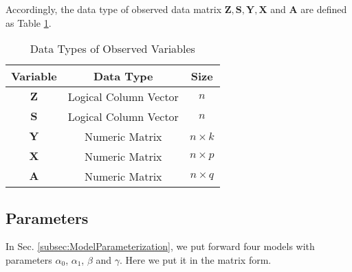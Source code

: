 \documentclass[article]{jss}
\begin{document}
Accordingly, the data type of observed data matrix $\mathbf{Z},\mathbf{S},\mathbf{Y},\mathbf{X}$ and $\mathbf{A}$ are defined as Table \ref{tbl::data}.
\begin{table}[!htbp]
  \centering
  \begin{tabular}{ccc}
    \toprule
    Variable & Data Type & Size \\
    \midrule
    $\mathbf{Z}$ & Logical Column Vector & $n$ \\
    $\mathbf{S}$ & Logical Column Vector & $n$ \\
    $\mathbf{Y}$ & Numeric Matrix & $n\times k$ \\
    $\mathbf{X}$ & Numeric Matrix & $n\times p$ \\
    $\mathbf{A}$ & Numeric Matrix & $n\times q$ \\
    \bottomrule
  \end{tabular}
  \label{tbl::data}
  \caption{Data Types of Observed Variables}
\end{table}

\subsection{Parameters}
In Sec. \ref{subsec:ModelParameterization}, we put forward four models with parameters $\alpha_0$, $\alpha_1$, $\beta$ and $\gamma$. Here we put it in the matrix form.
\end{document}
